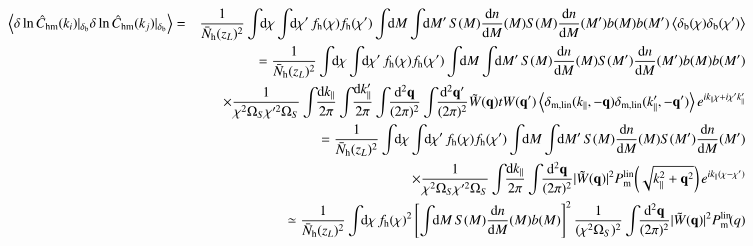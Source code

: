 \documentclass[onecolumn,notitlepage,showpacs,amsmath,amssymb,prd,floatfix]{revtex4-1}
\def\ave#1{\left\langle #1 \right\rangle}
\newcommand{\bq}{{\bf q}}
\newcommand{\tW}{\tilde{W}}
\newcommand{\dr}{\mathrm{d}}
\newcommand{\deltab}{\delta_{\rm b}}
\newcommand{\deltaml}{\delta_{\mathrm{m,lin}}}
\newcommand{\hchm}{\hat{C}_{\mathrm{hm}}}
\newcommand{\bh}{\mathrm{h}}
\newcommand{\bnh}{\frac{\dr n}{\dr M}}
\newcommand{\pml}{P^{\rm lin}_{\rm m}}
\newcommand{\bNh}{\bar{N}_{\rm h}}
\begin{document}
\begin{eqnarray}
 \ave{ \delta\ln\hchm(k_i)|_{\deltab} \delta\ln\hchm(k_j)|_{\deltab}}
  &=&\frac{1}{\bNh(z_L)^2}
  \int\!\!\dr\chi\int\!\!\dr\chi'\, f_\bh(\chi)f_\bh(\chi')
  \int\!\!\dr M\int\!\!\dr M'\, S(M)\bnh(M)S(M)\bnh(M')
  b(M)b(M')\ave{\deltab(\chi)\deltab(\chi')}\nonumber\\
 &&\hspace{-10em}=\frac{1}{\bNh(z_L)^2}
 \int\!\!\dr\chi\int\!\!\dr\chi'\, f_\bh(\chi)f_\bh(\chi')
  \int\!\!\dr M\int\!\!\dr M'\, S(M)\bnh(M)S(M')\bnh(M')
  b(M)b(M')
\nonumber\\
 &&\hspace{-8em}\times
  \frac{1}{\chi^2\Omega_S\chi^{\prime 2}\Omega_S}
\int\!\!\frac{\dr k_\parallel}{2\pi}\int\!\!\frac{\dr k'_\parallel}{2\pi}
\int\!\! \frac{\dr^2 \bq}{(2\pi)^2}
\int\!\! \frac{\dr^2 \bq'}{(2\pi)^2}
\tW(\bq)tW(\bq')\ave{\deltaml(k_\parallel,-\bq)\deltaml(k'_\parallel,-\bq')}
e^{ik_\parallel\chi+i\chi'k'_\parallel}\nonumber\\
 &&\hspace{-10em}=\frac{1}{\bNh(z_L)^2}
\int\!\!\dr\chi\int\!\!\dr\chi'\, f_\bh(\chi)f_\bh(\chi')
  \int\!\!\dr M\int\!\!\dr M'\, S(M)\bnh(M)S(M')\bnh(M')\nonumber\\
&&\hspace{-8em}\times  \frac{1}{\chi^2\Omega_S\chi^{\prime 2}\Omega_S}
\int\!\!\frac{\dr k_\parallel}{2\pi}
\int\!\! \frac{\dr^2 \bq}{(2\pi)^2}
|\tW(\bq)|^2\pml\!\left(\sqrt{k_\parallel^2+\bq^2}\right)
e^{ik_\parallel(\chi-\chi')}\nonumber\\
 &&\hspace{-10em}\simeq \frac{1}{\bNh(z_L)^2}\int\!\!\dr\chi\,
  f_\bh(\chi)^2\left[\int\!\!\dr M\, S(M)\bnh(M)b(M)\right]^2
  \frac{1}{(\chi^2\Omega_S)^2}
\int\!\! \frac{\dr^2 \bq}{(2\pi)^2}
|\tW(\bq)|^2\pml\!(q)
\end{eqnarray}
\end{document}
